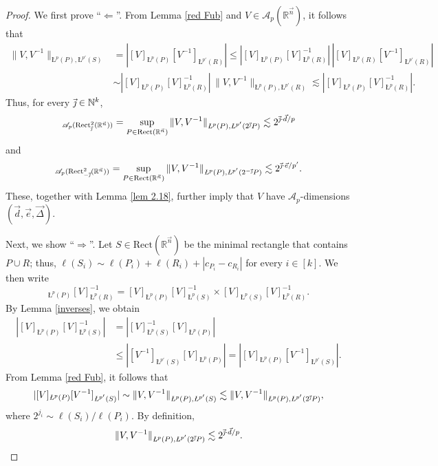 \documentclass[11pt, reqno]{amsart}
\theoremstyle{definition}
\theoremstyle{remark}
\numberwithin{equation}{section}
\newcommand{\A}{\mathscr A}
\newcommand{\N}{\mathbb N}
\newcommand{\R}{\mathbb R}
\newcommand{\vd}{\vec d}
\newcommand{\vDe}{\vec{\Delta}}
\newcommand{\ve}{\vec e}
\newcommand{\vj}{\vec{\textit{\j}}}
\newcommand{\vn}{\vec n}
\newcommand{\aveL}{\textit{\L}}
\newcommand{\abs}[1]{|#1|}
\newcommand{\Norm}[2]{\|#1\|_{#2}}
\newcommand{\Rect}{\mathrm{Rect}}
\begin{document}
\begin{proof}
We first prove ``$\Longleftarrow$''.
From Lemma \ref{red Fub} and $V\in\A_{p}(\R^{\vn})$, it follows that
\begin{align*}
\Norm{V,V^{-1}}{\aveL^p(P),\aveL^{p'}(S)}
&=\abs{[V]_{\aveL^{p}(P)}[V^{-1}]_{\aveL^{p'}(R)}}
\leq \abs{[V]_{\aveL^{p}(P)}[V]_{\aveL^{p}(R)}^{-1}} \,
\abs{[V]_{\aveL^{p}(R)} [V^{-1}]_{\aveL^{p'}(R)}} \\
&\sim \abs{[V]_{\aveL^{p}(P)}[V]_{\aveL^{p}(R)}^{-1}} \,
\Norm{V,V^{-1}}{\aveL^p(P),\aveL^{p'}(R)}
\lesssim \abs{[V]_{\aveL^{p}(P)}[V]_{\aveL^{p}(R)}^{-1}}.
\end{align*}
Thus, for every $\vj\in\N^k$,
\begin{align*}
[V]_{\A_p(\Rect^2_{\vj}(\R^{\vn}))}
=\sup_{P\in \Rect(\R^{\vn})} \Norm{V,V^{-1}}{\aveL^p(P),\aveL^{p'}(2^{\vj}P)}
\lesssim 2^{\vj\cdot\vd/p}
\end{align*}
and
\begin{align*}
[V]_{\A_p(\Rect^2_{-\vj}(\R^{\vn}))}
=\sup_{P\in \Rect(\R^{\vn})} \Norm{V,V^{-1}}{\aveL^p(P),\aveL^{p'}(2^{-\vj}P)}
\lesssim 2^{\vj\cdot\ve/p'}.
\end{align*}
These, together with Lemma \ref{lem 2.18},
further imply that $V$ have $\A_p$-dimensions $(\vd,\ve,\vDe)$.

Next, we show ``$\Longrightarrow$''.
Let $S\in\Rect(\R^{\vn})$ be the minimal rectangle that contains $P\cup R$; thus, $\ell(S_i)\sim\ell(P_i)+\ell(R_i)+\abs{c_{P_i}-c_{R_i}}$ for every $i\in[k]$. We then write
\begin{equation*}
[V]_{\aveL^{p}(P)}[V]_{\aveL^{p}(R)}^{-1}
=   [V]_{\aveL^{p}(P)}[V]_{\aveL^{p}(S)}^{-1}\times [V]_{\aveL^{p}(S)}[V]_{\aveL^{p}(R)}^{-1}.
\end{equation*}
By Lemma \ref{inverses}, we obtain
\begin{equation*}
\begin{split}
\abs{ [V]_{\aveL^{p}(P)}[V]_{\aveL^{p}(S)}^{-1}  }
&=\abs{ [V]_{\aveL^{p}(S)}^{-1} [V]_{\aveL^{p}(P)}  } \\
&\leq \abs{ [V^{-1}]_{\aveL^{p'}(S)} [V]_{\aveL^{p}(P)}  }
=\abs{  [V]_{\aveL^{p}(P)}  [V^{-1}]_{\aveL^{p'}(S)} }.
\end{split}
\end{equation*}
From Lemma \ref{red Fub}, it follows that
\begin{equation*}
\abs{  [V]_{\aveL^{p}(P)}  [V^{-1}]_{\aveL^{p'}(S)} }
\sim \Norm{V,V^{-1}}{\aveL^p(P),\aveL^{p'}(S)}
\lesssim \Norm{V,V^{-1}}{\aveL^p(P),\aveL^{p'}(2^{\vj}P)},
\end{equation*}
where $2^{j_i}\sim\ell(S_i)/\ell(P_i)$. By definition,
\begin{equation*}
\Norm{V,V^{-1}}{\aveL^p(P),\aveL^{p'}(2^{\vj}P)}\lesssim 2^{\vj\cdot\vd/p}.
\end{equation*}


\end{proof}
\end{document}
